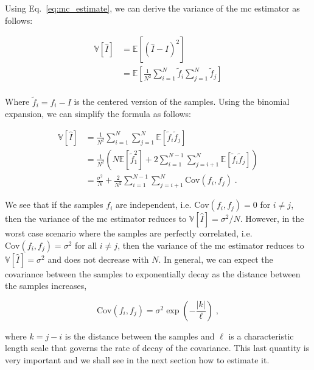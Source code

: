 \smallskip
Using Eq.~\eqref{eq:mc_estimate}, we can derive the variance of the \gls{mc} estimator as follows:

\begin{equation}
  \begin{aligned}
    \mathbb{V}[\hat{I}] &= \mathbb{E}\left[(\hat{I} - I)^2\right] \\
    &= \mathbb{E}\left[\frac{1}{N^2} \sum_{i=1}^N \tilde{f}_i\sum_{j=1}^N \tilde{f}_j \right] \\
  \end{aligned}
\end{equation}

Where $\tilde{f}_i = f_i - I$ is the centered version of the samples. Using the binomial expansion, we can simplify the formula as follows:

\begin{equation}
  \begin{aligned}
    \mathbb{V}[\hat{I}] &= \frac{1}{N^2} \sum_{i=1}^N \sum_{j=1}^N \mathbb{E}[\tilde{f}_i \tilde{f}_j] \\
    &= \frac{1}{N^2} \left( N\mathbb{E}[\tilde{f}_1^2] + 2\sum_{i=1}^{N-1}\sum_{j=i+1}^N \mathbb{E}[\tilde{f}_i \tilde{f}_j] \right) \\
    &= \frac{\sigma^2}{N} + \frac{2}{N^2}\sum_{i=1}^{N-1}\sum_{j=i+1}^N  \mathrm{Cov}(f_i, f_j)\;.
  \end{aligned}
\end{equation}

We see that if the samples $f_i$ are independent, i.e. $\mathrm{Cov}(f_i, f_j) = 0$ for $i \neq j$, then the variance of the \gls{mc} estimator reduces to $\mathbb{V}[\hat{I}] = \sigma^2 / N$. However, in the worst case scenario where the samples are perfectly correlated, i.e. $\mathrm{Cov}(f_i, f_j) = \sigma^2$ for all $i \neq j$, then the variance of the \gls{mc} estimator reduces to $\mathbb{V}[\hat{I}] = \sigma^2$ and does not decrease with $N$. In general, we can expect the covariance between the samples to exponentially decay as the distance between the samples increases,

\begin{equation}
  \mathrm{Cov}(f_i, f_j) = \sigma^2 \exp \left(-\dfrac{|k|}{\ell}\right)\;,
\end{equation}

where $k = j - i$ is the distance between the samples and $\ell$ is a characteristic length scale that governs the rate of decay of the covariance. This last quantity is very important and we shall see in the next section how to estimate it.

